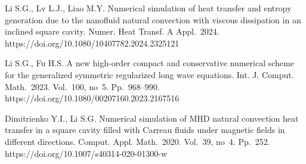 \documentclass[12pt]{llncs}
\begin{document}
\begin{thebibliography}{9} %
 Li S.G., Lv L.J., Liao M.Y. Numerical simulation of heat transfer and entropy generation due to the nanofluid natural convection with viscous dissipation in an inclined square cavity. Numer. Heat Transf. A Appl.~2024. https://doi.org/10.1080/10407782.2024.2325121

 Li S.G., Fu H.S. A new high-order compact and conservative numerical scheme for the generalized symmetric regularized long wave equations. Int. J. Comput. Math.~2023. Vol.~100, no~5. Pp.~968--990. https://doi.org/10.1080/00207160.2023.2167516

 Dimitrienko Y.I., Li S.G. Numerical simulation of MHD natural convection heat transfer in a square cavity filled with Carreau fluids under magnetic fields in different directions. Comput. Appl. Math.~2020. Vol.~39, no~4. Pp.~252. https://doi.org/10.1007/s40314-020-01300-w





\end{thebibliography}
\end{document}
